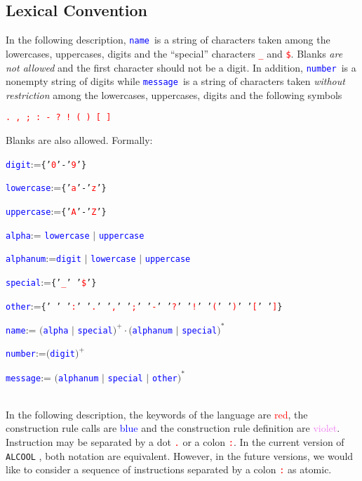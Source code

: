 \documentclass[article,11pt]{amsbook}
\def\wrn#1{\textcolor{red}{#1}}
\def\hil#1{\textcolor{blue}{#1}}
\def\voh#1{\textcolor{violet}{#1}}
\def\alcool{\texttt{ALCOOL} }
\def\name{{\hil{\texttt{\scriptsize name}}}}
\def\message{{\hil{\texttt{\scriptsize message}}}}
\def\numb{{\hil{\texttt{\scriptsize number}}}}
\def\kw#1{\wrn{\texttt{#1}}}
\begin{document}
\subsection{Lexical Convention}
In the following description, \name\ is a string of characters taken
among the lowercases, uppercases, digits and the ``special'' characters
\wrn{\texttt{\_}} and \wrn{\texttt{\$}}. Blanks {\em are not allowed}
and the first character should not be a digit. In addition, \numb\ is a
nonempty string of digits while \message\ is a string of
characters taken {\em without restriction} among the lowercases,
uppercases, digits and the following symbols

 \kw{. , ; : - ? ! ( ) [ ]}

\noindent
Blanks are also allowed. Formally:\\

{\scriptsize
\hil{\texttt{digit}}:=\texttt{\{'\wrn{0}'-'\wrn{9}'\}}

\hil{\texttt{lowercase}}:=\texttt{\{'\wrn{a}'-'\wrn{z}'\}}

\hil{\texttt{uppercase}}:=\texttt{\{'\wrn{A}'-'\wrn{Z}'\}}

\hil{\texttt{alpha}}:= \hil{\texttt{lowercase}} $\big|$ \hil{\texttt{uppercase}}


\hil{\texttt{alphanum}}:=\hil{\texttt{digit}} $\big|$ \hil{\texttt{lowercase}} $\big|$ \hil{\texttt{uppercase}}

\hil{\texttt{special}}:=\texttt{\{'\wrn{\_}' '\wrn{\$}'\}}

\hil{\texttt{other}}:=\texttt{\{' ' '\wrn{:}' '\wrn{.}' '\wrn{,}' '\wrn{;}' '\wrn{-}' '\wrn{?}' '\wrn{!}' '\wrn{(}' '\wrn{)}' '\wrn{[}' '\wrn{]}\}}

\name:= $\big($\hil{\texttt{alpha}} $\big|$ \hil{\texttt{special}}$\big)^+\cdot\big($\hil{\texttt{alphanum}} $\big|$ \hil{\texttt{special}}$\big)^\ast$

\numb:=$\big($\hil{\texttt{digit}}$\big)^+$

\hil{\texttt{message}}:= $\big($\hil{\texttt{alphanum}} $\big|$ \hil{\texttt{special}} $\big|$ \hil{\texttt{other}}$\big)^\ast$
}\\

\noindent In the following description, the keywords of the language are
\wrn{red}, the construction rule calls are \hil{blue} and the
construction rule definition are \voh{violet}.  Instruction may be
separated by a dot \texttt{\wrn{.}} or a colon
\kw{:}. In the current version of \alcool\!,
both notation are equivalent. However, in the future versions, we would
like to consider a sequence of instructions separated by a colon
\kw{:} as atomic.
\end{document}
